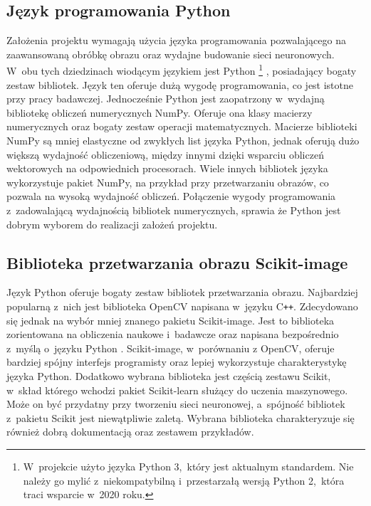 \subsection{Język programowania Python}
Założenia projektu wymagają użycia języka programowania pozwalającego na
zaawansowaną obróbkę obrazu oraz wydajne budowanie sieci neuronowych.
W~obu tych dziedzinach wiodącym językiem jest Python%
\footnote{%
    W~projekcie użyto języka Python 3,~który jest aktualnym standardem.
    Nie należy go mylić z~niekompatybilną i~przestarzałą wersją Python 2,~która
    traci wsparcie w~2020 roku.
}
, posiadający bogaty zestaw
bibliotek.
Język ten oferuje dużą wygodę programowania, co jest istotne przy pracy
badawczej.
Jednocześnie Python jest zaopatrzony w~wydajną bibliotekę obliczeń numerycznych
NumPy.
Oferuje ona klasy macierzy numerycznych oraz bogaty zestaw operacji
matematycznych.
Macierze biblioteki NumPy są mniej elastyczne od zwykłych list języka Python,
jednak oferują dużo większą wydajność obliczeniową, między innymi dzięki
wsparciu obliczeń wektorowych na odpowiednich procesorach.
Wiele innych bibliotek języka wykorzystuje pakiet NumPy, na przykład przy
przetwarzaniu obrazów, co pozwala na wysoką wydajność obliczeń.
Połączenie wygody programowania z~zadowalającą wydajnością bibliotek
numerycznych, sprawia że Python jest dobrym wyborem do realizacji założeń
projektu.

\subsection{Biblioteka przetwarzania obrazu Scikit-image}
Język Python oferuje bogaty zestaw bibliotek przetwarzania obrazu.
Najbardziej popularną z~nich jest biblioteka OpenCV napisana w~języku
C\texttt{++}.
Zdecydowano się jednak na wybór mniej znanego pakietu Scikit-image.
Jest to biblioteka zorientowana na obliczenia naukowe i~badawcze oraz napisana
bezpośrednio z~myślą o~języku Python \cite{scikit-image}.
Scikit-image, w~porównaniu z OpenCV, oferuje bardziej spójny interfejs
programisty oraz lepiej wykorzystuje charakterystykę języka Python.
Dodatkowo wybrana biblioteka jest częścią zestawu Scikit, w~skład którego
wchodzi pakiet Scikit-learn służący do uczenia maszynowego.
Może on być przydatny przy tworzeniu sieci neuronowej, a~spójność bibliotek
z~pakietu Scikit jest niewątpliwie zaletą.
Wybrana biblioteka charakteryzuje się również dobrą dokumentacją
\cite{scikit_reference} oraz zestawem przykładów.

